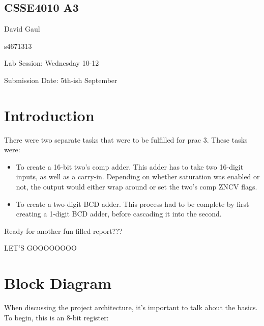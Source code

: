 \documentclass[12pt,a4paper]{article}
\begin{document}
\begin{center}
\bigskip
\section*{CSSE4010 A3}
\end{center}

David Gaul

s4671313

Lab Session: Wednesday 10-12

Submission Date: 5th-ish September

\section{Introduction}

There were two separate tasks that were to be fulfilled for prac 3. These tasks were:

\begin{itemize}
    \item To create a 16-bit two's comp adder. This adder has to take two 16-digit inputs, as well as a carry-in. Depending on whether saturation was enabled or not, the output would either wrap around or set the two's comp ZNCV flags.
    \item To create a two-digit BCD adder. This process had to be complete by first creating a 1-digit BCD adder, before cascading it into the second.
\end{itemize}

Ready for another fun filled report???

LET'S GOOOOOOOO


\section{Block Diagram}

When discussing the project architecture, it's important to talk about the basics. To begin, this is an 8-bit register:
\end{document}
